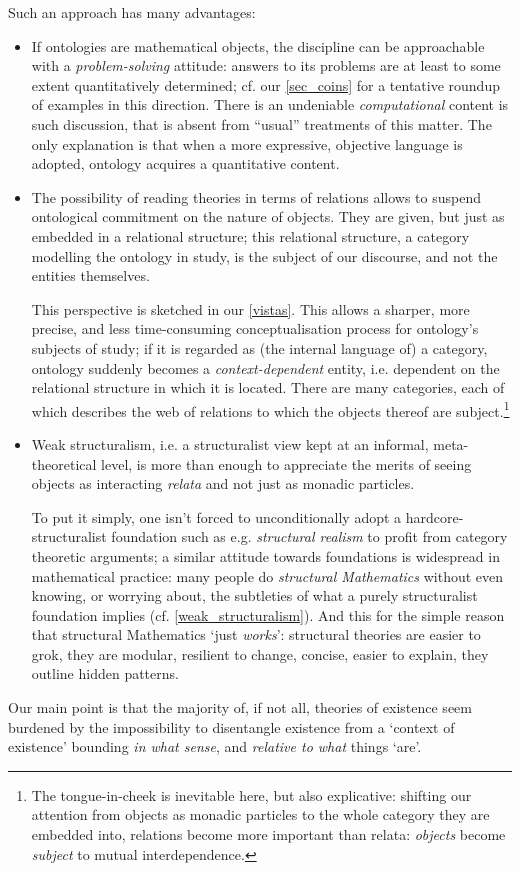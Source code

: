 Such an approach has many advantages:
\begin{itemize}
    \item If ontologies are mathematical objects, the discipline can be approachable with a \emph{problem-solving} attitude: answers to its problems are at least to some extent quantitatively determined; cf. our \autoref{sec_coins} for a tentative roundup of examples in this direction. There is an undeniable \emph{computational} content is such discussion, that is absent from ``usual'' treatments of this matter. The only explanation is that when a more expressive, objective language is adopted, ontology acquires a quantitative content.
    \item The possibility of reading theories in terms of relations allows to suspend ontological commitment on the nature of objects. They are given, but just as embedded in a relational structure; this relational structure, a category modelling the ontology in study, is the subject of our discourse, and not the entities themselves. 
    
    This perspective is sketched in our \autoref{vistas}. This allows a sharper, more precise, and less time-consuming conceptualisation process for ontology's subjects of study; if it is regarded as (the internal language of) a category, ontology suddenly becomes a \emph{context-dependent} entity, i.e. dependent on the relational structure in which it is located. There are many categories, each of which describes the web of relations to which the objects thereof are subject.\footnote{The tongue-in-cheek is inevitable here, but also explicative: shifting our attention from objects as monadic particles to the whole category they are embedded into, relations become more important than relata: \emph{objects} become \emph{subject} to mutual interdependence.}
    \item Weak structuralism, i.e. a structuralist view kept at an informal, meta\hyp{}theoretical level, is more than enough to appreciate the merits of seeing objects as interacting \emph{relata} and not just as monadic particles.
    
    To put it simply, one isn't forced to unconditionally adopt a hardcore\hyp{}structuralist foundation such as e.g. \emph{structural realism} \cite{bain2013category,eva2016category} to profit from category theoretic arguments; a similar attitude towards foundations is widespread in mathematical practice: many people do \textit{structural Mathematics} without even knowing, or worrying about, the subtleties of what a purely structuralist foundation implies (cf. \autoref{weak_structuralism}). And this for the simple reason that structural Mathematics `just \emph{works}': structural theories are easier to grok, they are modular, resilient to change, concise, easier to explain, they outline hidden patterns.
\end{itemize}
Our main point is that the majority of, if not all, theories of existence seem burdened by the impossibility to disentangle existence from a `context of existence' bounding \emph{in what sense}, and \emph{relative to what} things `are'. 

